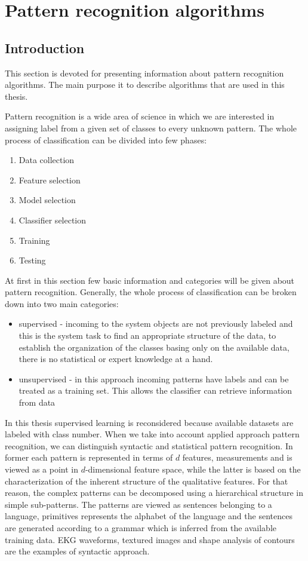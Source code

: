 \section{Pattern recognition algorithms}
\label{cha:Introduction}
\subsection{Introduction}
This section is devoted for presenting information about pattern recognition
algorithms. The main purpose it to describe algorithms that are used in this
thesis. 

Pattern recognition is a wide area of science in which we are interested in
assigning label from a given set of classes to every unknown pattern. The whole 
process of classification can be divided into few phases:
\begin{enumerate}
    \item Data collection
    \item Feature selection
    \item Model selection
    \item Classifier selection
    \item Training 
    \item Testing
\end{enumerate}
At first in this section few basic information and categories will be given 
about pattern recognition. Generally, the whole process of classification
can be broken down into two main categories:
\begin{itemize}
    \item supervised - incoming to the system objects are not previously
        labeled and this is the system task to find an appropriate structure of
        the data, to establish the organization of the classes basing only on
        the available data, there is no statistical or expert knowledge at a
        hand.
    \item unsupervised - in this approach incoming patterns have labels and can
        be treated as a training set. This allows the classifier can retrieve
        information from data 
\end{itemize}
In this thesis supervised learning is reconsidered because available datasets 
are labeled with class number. When we take into account applied approach
pattern recognition, we can distinguish syntactic and statistical 
pattern recognition. In former each pattern is represented in terms of 
$d$ features, measurements and is viewed as a point in
$d$-dimensional feature space, while the latter
is  based on the characterization of the inherent structure of the 
qualitative features. For that  reason, the complex patterns can be
decomposed using a hierarchical structure in simple  sub-patterns.
The patterns are viewed as sentences belonging to a language, primitives
represents the alphabet of the language and the sentences are generated
according to a grammar which is inferred from the available training data.
EKG waveforms, textured images and shape analysis of contours are the examples
of syntactic approach.

